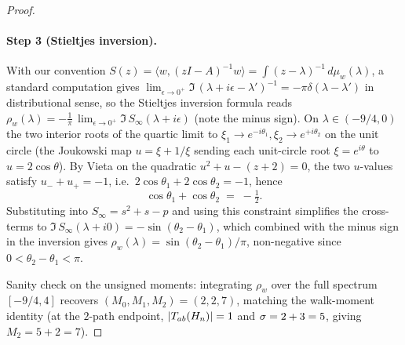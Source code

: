 \begin{proof}
\paragraph{Step 3 (Stieltjes inversion).}
With our convention
$S(z) = \langle w, (zI - A)^{-1} w \rangle = \int (z - \lambda)^{-1}\, d\mu_{w}(\lambda)$,
a standard computation gives
$\lim_{\epsilon \to 0^{+}} \Im\, (\lambda + i\epsilon - \lambda')^{-1} = -\pi \delta(\lambda - \lambda')$
in distributional sense, so the Stieltjes inversion formula reads
$\rho_{w}(\lambda) = -\tfrac{1}{\pi}\, \lim_{\epsilon \to 0^{+}} \Im\, S_{\infty}(\lambda + i\epsilon)$
(note the minus sign). On $\lambda \in (-9/4, 0)$ the two interior roots of the quartic limit
to $\xi_{1} \to e^{-i\theta_{1}}, \xi_{2} \to e^{+i\theta_{2}}$ on the
unit circle (the Joukowski map $u = \xi + 1/\xi$ sending each
unit-circle root $\xi = e^{i\theta}$ to $u = 2\cos\theta$). By Vieta on
the quadratic $u^{2} + u - (z + 2) = 0$, the two $u$-values satisfy
$u_{-} + u_{+} = -1$, i.e.\ $2\cos\theta_{1} + 2\cos\theta_{2} = -1$,
hence
\[
\cos\theta_{1} + \cos\theta_{2} \;=\; -\tfrac{1}{2}.
\]
Substituting into $S_{\infty} = s^{2} + s - p$ and using this constraint
simplifies the cross-terms to
$\Im\, S_{\infty}(\lambda + i 0) = -\sin(\theta_{2} - \theta_{1})$,
which combined with the minus sign in the inversion gives
$\rho_{w}(\lambda) = \sin(\theta_{2} - \theta_{1})/\pi$, non-negative
since $0 < \theta_{2} - \theta_{1} < \pi$.

Sanity check on the unsigned moments: integrating $\rho_{w}$ over the
full spectrum $[-9/4, 4]$ recovers $(M_{0}, M_{1}, M_{2}) = (2, 2, 7)$,
matching the walk-moment identity  (at the
$2$-path endpoint, $|T_{ab}(H_{n})| = 1$ and $\sigma = 2 + 3 = 5$,
giving $M_{2} = 5 + 2 = 7$).


\end{proof}
